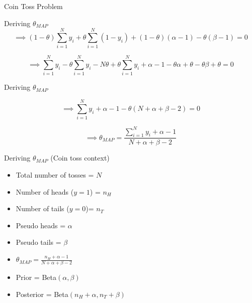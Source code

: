 \documentclass{beamer}
\begin{document}
\begin{section}{Coin Toss Problem}
\begin{frame}{Deriving $\theta_{MAP}$}
        \begin{equation*}
            \implies (1 - \theta) \sum_{i = 1}^{N} y_i + \theta \sum_{i = 1}^{N} (1 - y_i) + (1 - \theta) (\alpha - 1) - \theta (\beta - 1) = 0
        \end{equation*}

        \begin{equation*}
            \implies \sum_{i = 1}^{N} y_i - \theta \sum_{i = 1}^{N} y_i - N \theta + \theta \sum_{i = 1}^{N} y_i + \alpha - 1 - \theta \alpha  + \theta - \theta \beta + \theta = 0
        \end{equation*}

    \end{frame}

    \begin{frame}{Deriving $\theta_{MAP}$}

        \begin{equation*}
            \implies \sum_{i = 1}^{N} y_i + \alpha - 1 - \theta ( N + \alpha + \beta - 2) = 0
        \end{equation*}

        \begin{equation*}
            \implies \theta_{MAP} = \frac{\sum_{i = 1}^{N} y_i + \alpha - 1}{N + \alpha + \beta - 2}
        \end{equation*}
    \end{frame}

    \begin{frame}{Deriving $\theta_{MAP}$ (Coin toss context)}
        \begin{itemize} [<+->]
            \item Total number of tosses = $N$
            \item Number of heads ($y=1$) = $n_H$
            \item Number of tails ($y=0$)= $n_T$
            \item Pseudo heads  = $\alpha$
            \item Pseudo tails = $\beta$
            \item $\theta_{MAP} = \frac{n_H + \alpha - 1}{N + \alpha + \beta - 2}$
            \item Prior = Beta$(\alpha, \beta)$
            \item Posterior = Beta$(n_H + \alpha, n_T + \beta)$
        \end{itemize}
        
    \end{frame}


\end{section}
\end{document}

